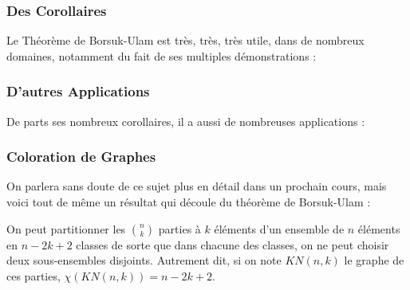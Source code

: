 \documentclass{beamercours}
\begin{document}
\begin{frame}
    \frametitle{Des Corollaires}
    Le Théorème de Borsuk-Ulam est très, très, très utile, dans de nombreux domaines, notamment du fait de ses multiples démonstrations :
    \begin{itemize}
    \end{itemize}
\end{frame}
\begin{frame}
    \frametitle{D'autres Applications}
    De parts ses nombreux corollaires, il a aussi de nombreuses applications :
    \begin{itemize}
    \end{itemize}
\end{frame}

\begin{frame}
    \frametitle{Coloration de Graphes}
    On parlera sans doute de ce sujet plus en détail dans un prochain cours, mais voici tout de même un résultat qui découle du théorème de Borsuk-Ulam : \\
    \begin{theorem}
        On peut partitionner les $\binom{n}{k}$ parties à $k$ éléments d'un ensemble de $n$ éléments en $n - 2k + 2$ classes de sorte que dans chacune des classes, on ne peut choisir deux sous-ensembles disjoints. Autrement dit, si on note $KN(n, k)$ le graphe de ces parties, $\chi\left(KN(n, k)\right) = n - 2k + 2$.
    \end{theorem}

\end{frame}
\end{document}
